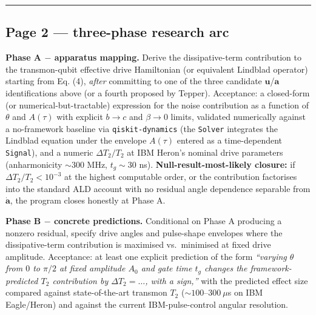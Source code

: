 \documentclass[
  11pt,
]{article}
\begin{document}
\begin{center}\rule{0.5\linewidth}{0.5pt}\end{center}

\hypertarget{page-2-three-phase-research-arc}{%
\subsection{Page 2 --- three-phase research
arc}\label{page-2-three-phase-research-arc}}

\textbf{Phase A \(-\) apparatus mapping.} Derive the dissipative-term
contribution to the transmon-qubit effective drive Hamiltonian (or
equivalent Lindblad operator) starting from Eq. (4), \emph{after}
committing to one of the three candidate \(\mathbf{u}\)/\(\mathbf{a}\)
identifications above (or a fourth proposed by Tepper). Acceptance: a
closed-form (or numerical-but-tractable) expression for the noise
contribution as a function of \(\theta\) and \(A(\tau)\) with explicit
\(b\to c\) and \(\beta\to 0\) limits, validated numerically against a
no-framework baseline via \texttt{qiskit-dynamics} (the \texttt{Solver}
integrates the Lindblad equation under the envelope \(A(\tau)\) entered
as a time-dependent \texttt{Signal}), and a numeric \(\Delta T_2/T_2\)
at IBM Heron's nominal drive parameters (anharmonicity \(\sim 300\) MHz,
\(t_g\sim 30\) ns). \textbf{Null-result-most-likely closure:} if
\(\Delta T_2/T_2 < 10^{-3}\) at the highest computable order, or the
contribution factorises into the standard ALD account with no residual
angle dependence separable from \(\dot{\mathbf{a}}\), the program closes
honestly at Phase A.

\textbf{Phase B \(-\) concrete predictions.} Conditional on Phase A
producing a nonzero residual, specify drive angles and pulse-shape
envelopes where the dissipative-term contribution is maximised
vs.~minimised at fixed drive amplitude. Acceptance: at least one
explicit prediction of the form \emph{``varying \(\theta\) from \(0\) to
\(\pi/2\) at fixed amplitude \(A_0\) and gate time \(t_g\) changes the
framework-predicted \(T_2\) contribution by \(\Delta T_2 = \ldots\),
with a sign,''} with the predicted effect size compared against
state-of-the-art transmon \(T_2\) (\(\sim 100\)--\(300~\mu\)s on IBM
Eagle/Heron) and against the current IBM-pulse-control angular
resolution.
\end{document}
